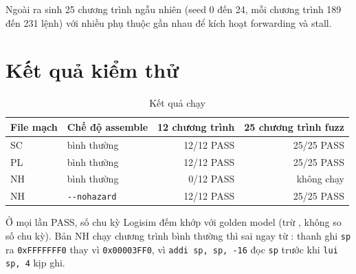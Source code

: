 \documentclass[../report.tex]{subfiles}
\begin{document}
Ngoài ra  sinh 25 chương trình ngẫu nhiên (seed 0 đến 24, mỗi chương trình 189 đến 231 lệnh)
với nhiều phụ thuộc gần nhau để kích hoạt forwarding và stall.

\section{Kết quả kiểm thử}\label{sec:testres}

\begin{table}[H]
\centering\small
\caption{Kết quả chạy }\label{tab:testres}
\begin{tabular}{@{}llrr@{}}
\toprule
File mạch & Chế độ assemble & 12 chương trình & 25 chương trình fuzz \\
\midrule
SC & bình thường & 12/12 PASS & 25/25 PASS \\
PL & bình thường & 12/12 PASS & 25/25 PASS \\
NH & bình thường & 0/12 PASS & không chạy \\
NH & \texttt{-{}-nohazard} & 12/12 PASS & 25/25 PASS \\
\bottomrule
\end{tabular}
\end{table}

Ở mọi lần PASS, số chu kỳ Logisim đếm khớp với golden model (trừ , không so số chu kỳ).
Bản NH chạy chương trình bình thường thì sai ngay từ : thanh ghi \texttt{sp} ra
\texttt{0xFFFFFFF0} thay vì \texttt{0x00003FF0}, vì \texttt{addi sp, sp, -16} đọc \texttt{sp} trước khi
\texttt{lui sp, 4} kịp ghi.
\end{document}
